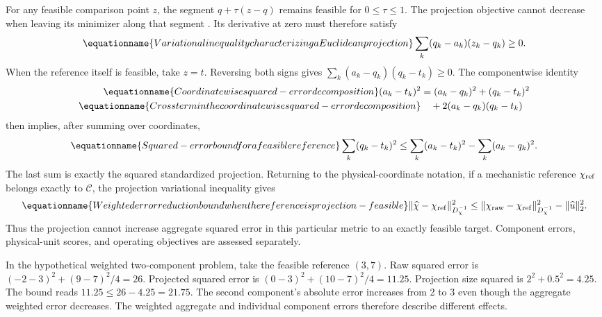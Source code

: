 For any feasible comparison point $z$, the segment $q+\tau(z-q)$ remains feasible for $0\le\tau\le1$. The projection objective cannot decrease when leaving its minimizer along that segment \citep{Boyd2004}. Its derivative at zero must therefore satisfy
\begin{equation}
\equationname{Variational inequality characterizing a Euclidean projection}
\sum_k(q_k-a_k)(z_k-q_k)\ge0.
\end{equation}
When the reference itself is feasible, take $z=t$. Reversing both signs gives $\sum_k(a_k-q_k)(q_k-t_k)\ge0$. The componentwise identity
\begin{align}
\equationname{Coordinatewise squared-error decomposition}
(a_k-t_k)^2&=(a_k-q_k)^2+(q_k-t_k)^2\\
\equationname{Cross term in the coordinatewise squared-error decomposition}
&\quad+2(a_k-q_k)(q_k-t_k)
\end{align}
then implies, after summing over coordinates,
\begin{equation}
\equationname{Squared-error bound for a feasible reference}
\sum_k(q_k-t_k)^2\le\sum_k(a_k-t_k)^2-\sum_k(a_k-q_k)^2.
\end{equation}
The last sum is exactly the squared standardized projection. Returning to the physical-coordinate notation, if a mechanistic reference $\chi_{\rm ref}$ belongs exactly to $\mathcal C$, the projection variational inequality gives
\begin{equation}
\equationname{Weighted error reduction bound when the reference is projection-feasible}
\|\widehat\chi-\chi_{\rm ref}\|_{D_\chi^{-1}}^2
\le\|\chi_{\rm raw}-\chi_{\rm ref}\|_{D_\chi^{-1}}^2
-\|\widehat u\|_2^2.
\label{eq:plant_projection_error_exact}
\end{equation}
Thus the projection cannot increase aggregate squared error in this particular metric to an exactly feasible target. Component errors, physical-unit scores, and operating objectives are assessed separately.

In the hypothetical weighted two-component problem, take the feasible reference $(3,7)$. Raw squared error is $(-2-3)^2+(9-7)^2/4=26$. Projected squared error is $(0-3)^2+(10-7)^2/4=11.25$. Projection size squared is $2^2+0.5^2=4.25$. The bound reads $11.25\le26-4.25=21.75$. The second component's absolute error increases from 2 to 3 even though the aggregate weighted error decreases. The weighted aggregate and individual component errors therefore describe different effects.


